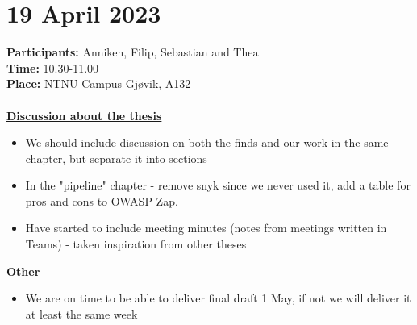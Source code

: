 \section{19 April 2023}
\textbf{Participants:} Anniken, Filip, Sebastian and Thea \\
\textbf{Time:} 10.30-11.00 \\
\textbf{Place:} NTNU Campus Gjøvik, A132
\\~\\
\textbf{\underline{Discussion about the thesis}}
\begin{itemize}
    \item We should include discussion on both the finds and our work in the same chapter, but separate it into sections
    \item In the "pipeline" chapter - remove snyk since we never used it, add a table for pros and cons to OWASP Zap.
    \item Have started to include meeting minutes (notes from meetings written in Teams) - taken inspiration from other theses 
\end{itemize}

\textbf{\underline{Other}}
\begin{itemize}
    \item We are on time to be able to deliver final draft 1 May, if not we will deliver it at least the same week 
\end{itemize}